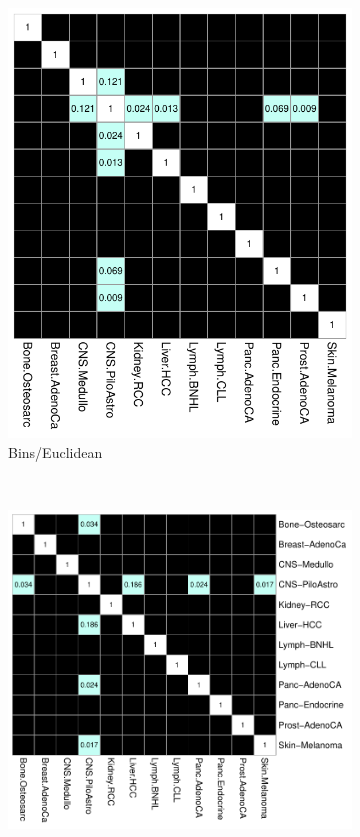 \begin{figure}[ht!]
    \begin{subfigure}{.45\textwidth}
    \includegraphics[scale=0.65]{graphics/bootstrap_bins_euclidean.pdf}
    \caption{Bins/Euclidean}
    \label{fig:bootstrap_bins_euclidean}
    \end{subfigure}
    ~
    \begin{subfigure}{.55\textwidth}
    \includegraphics[scale=0.65]{graphics/bootstrap_bins_wasserstein.pdf}

\end{subfigure}
\end{figure}
